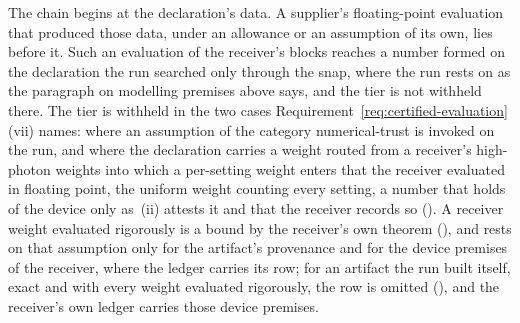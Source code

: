 \begin{remark}
The chain begins at the declaration's data. A supplier's floating-point
evaluation that produced those data, under an allowance or an assumption of
its own, lies before it. Such an evaluation of the receiver's blocks reaches
a number formed on the declaration the run searched only through the snap,
where the run rests on  as the
paragraph on modelling premises above says, and the tier is not withheld
there. The tier is withheld in the two cases
Requirement~\ref{req:certified-evaluation}\,(vii) names: where an
assumption of the category numerical-trust is invoked on the run, and where
the declaration carries a weight routed from a receiver's high-photon weights
into which a per-setting weight enters that the receiver evaluated in
floating point, the uniform weight counting every setting, a number that
holds of the device only as \,(ii) attests it and
that the receiver records so (). A receiver weight
evaluated rigorously is a bound by the receiver's own theorem
(), and rests on that assumption only for
the artifact's provenance and for the device premises of the receiver, where
the ledger carries its row; for an artifact the run built itself, exact and
with every weight evaluated rigorously, the row is omitted
(), and the receiver's own
ledger carries those device premises.


\end{remark}

